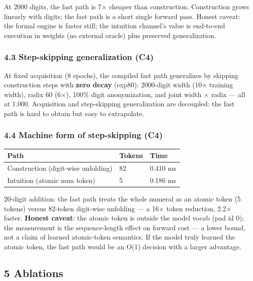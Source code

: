 \documentclass[
]{article}
\begin{document}
At 2000 digits, the fast path is 7× cheaper than construction.
Construction grows linearly with digits; the fast path is a short single
forward pass. Honest caveat: the formal engine is faster still; the
intuition channel's value is end-to-end execution in weights (no
external oracle) plus preserved generalization.

\subsubsection{4.3 Step-skipping generalization
(C4)}\label{step-skipping-generalization-c4}

At fixed acquisition (8 epochs), the compiled fast path generalizes by
skipping construction steps with \textbf{zero decay} (exp80): 2000-digit
width (10× training width), radix 60 (6×), 100\% digit anonymization,
and joint width × radix --- all at 1.000. Acquisition and step-skipping
generalization are decoupled: the fast path is hard to obtain but easy
to extrapolate.

\subsubsection{4.4 Machine form of step-skipping
(C4)}\label{machine-form-of-step-skipping-c4}

\begin{longtable}[]{@{}lll@{}}
\toprule\noalign{}
Path & Tokens & Time \\
\midrule\noalign{}
\endhead
\bottomrule\noalign{}
\endlastfoot
Construction (digit-wise unfolding) & 82 & 0.410 ms \\
Intuition (atomic num token) & 5 & 0.186 ms \\
\end{longtable}

20-digit addition: the fast path treats the whole numeral as an atomic
token (5 tokens) versus 82-token digit-wise unfolding --- a 16× token
reduction, 2.2× faster. \textbf{Honest caveat}: the atomic token is
outside the model vocab (pad id 0); the measurement is the
sequence-length effect on forward cost --- a lower bound, not a claim of
learned atomic-token semantics. If the model truly learned the atomic
token, the fast path would be an O(1) decision with a larger advantage.

\subsection{5 Ablations}\label{ablations}
\end{document}
